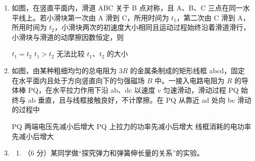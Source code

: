 \documentclass[\gkver]{gaokaozhenti}
\begin{document}
\begin{enumerate}
{figs/16b.png}
{figs/16c.png}
{figs/16d.png}


\item
如图，在竖直平面内，滑道 ABC 关于 B 点对称，且 A、B、C 三点在同一水平线上。若小滑块第一次由 A 滑到 C，所用时间为 $t_{1}$，第二次由 C 滑到 A，所用时间为 $t_{2}$，小滑块两次的初速度大小相同且运动过程始终沿着滑道滑行，小滑块与滑道的动摩擦因数恒定，则


{$t_{1}=t_{2}$}
{$t_{1}>t_{2}$}
{无法比较 $t_{1}$、$t_{2}$ 的大小}


\item
如图，由某种粗细均匀的总电阻为 $3R$ 的金属条制成的矩形线框 abcd，固定在水平面内且处于方向竖直向下的匀强磁场 $B$ 中。一接入电路电阻为 $R$ 的导体棒 PQ，在水平拉力作用下沿 ab、dc 以速度 $v$ 匀速滑动，滑动过程 PQ 始终与 ab 垂直，且与线框接触良好，不计摩擦。在 PQ 从靠近 ad 处向 bc 滑动的过程中


{PQ 两端电压先减小后增大}
{PQ 上拉力的功率先减小后增大}
{线框消耗的电功率先减小后增大}


\item
\begin{enumerate}
	\item
	（6 分）某同学做“探究弹力和弹簧伸长量的关系”的实验。


\end{enumerate}
\end{enumerate}
\end{document}
